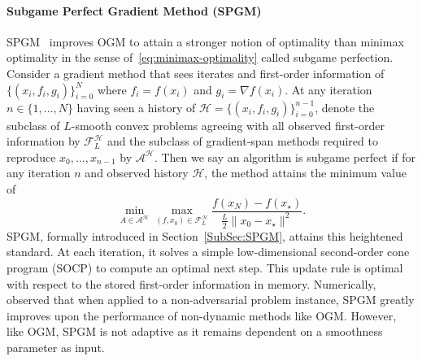 \documentclass[11pt]{article}
\numberwithin{equation}{section}
\theoremstyle{definition}
\theoremstyle{plain}
\theoremstyle{definition}
\begin{document}
\paragraph{Subgame Perfect Gradient Method (SPGM)}
SPGM~\cite{SPGM} improves OGM to attain a stronger notion of optimality than minimax optimality in the sense of~\eqref{eq:minimax-optimality} called subgame perfection. Consider a gradient method that sees iterates and first-order information of $\{(x_i,f_i,g_i)\}_{i=0}^N$ where $f_i=f(x_i)$ and $g_i=\nabla f(x_i)$. At any iteration $n\in\{1,\dots, N\}$ having seen a history of $\mathcal{H}=\{(x_i,f_i,g_i)\}^{n-1}_{i=0}$, denote the subclass of $L$-smooth convex problems agreeing with all observed first-order information by $\mathcal{F}^\mathcal{H}_L$ and the subclass of gradient-span methods required to reproduce $x_0,\dots,x_{n-1}$ by $\mathcal{A}^\mathcal{H}$. Then we say an algorithm is subgame perfect if for any iteration $n$ and observed history $\mathcal{H}$, the method attains the minimum value of
\begin{equation}\label{eq:subgame-perfect}
    \min_{A\in \mathcal{A}^\mathcal{H}} \max_{(f,x_0)\in\mathcal{F}_L^\mathcal{H}} \frac{f(x_N)-f(x_\star)}{\frac{L}{2}\|x_0-x_\star\|^2}.
\end{equation}
SPGM, formally introduced in Section~\ref{SubSec:SPGM}, attains this heightened standard. At each iteration, it solves a simple low-dimensional second-order cone program (SOCP) to compute an optimal next step. This update rule is optimal with respect to the stored first-order information in memory. Numerically, \cite{SPGM} observed that when applied to a non-adversarial problem instance, SPGM greatly improves upon the performance of non-dynamic methods like OGM. However, like OGM, SPGM is not adaptive as it remains dependent on a smoothness parameter as input.
\end{document}
